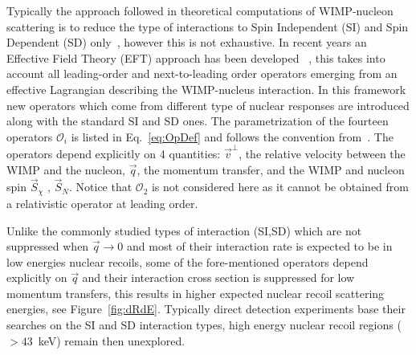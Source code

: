 Typically the approach followed in theoretical computations of WIMP-nucleon scattering is to reduce the type of interactions to Spin Independent (SI) and Spin Dependent (SD) only~\cite{LEWIN}, however this is not exhaustive. In recent years an Effective Field Theory (EFT) approach has been developed ~\cite{Fitzpatrick:2012ib,Anand:MathTools,Fitzpatrick:MathTools}, this takes into account all leading-order and next-to-leading order operators emerging from an effective Lagrangian describing the WIMP-nucleus interaction. In this framework new operators which come from different type of nuclear responses are introduced along with the standard SI and SD ones. The parametrization of the fourteen operators $\mathcal{O}_i$ is listed in Eq.~\ref{eq:OpDef} and follows the convention from~\cite{Anand:MathTools}. The operators depend explicitly on 4 quantities: $\vec{v}^{\perp}$, the relative velocity between the WIMP and the nucleon, $\vec{q}$, the momentum transfer, and the WIMP and nucleon spin $\vec{S}_\chi$ , $\vec{S}_N$. Notice that $\mathcal{O}_2$ is not considered here as it cannot be obtained from a relativistic operator at leading order.
	 
	    Unlike the commonly studied types of interaction (SI,SD) which are not suppressed when $\vec{q} \rightarrow 0$ and most of their interaction rate is expected to be in low energies nuclear recoils, some of the fore-mentioned operators depend explicitly on $\vec{q}$ and their interaction cross section is suppressed for low momentum transfers, this results in higher expected nuclear recoil scattering energies, see Figure~\ref{fig:dRdE}. Typically direct detection experiments base their searches on the SI and SD interaction types, high energy nuclear recoil regions ($> 43$~keV) remain then unexplored.
	    
